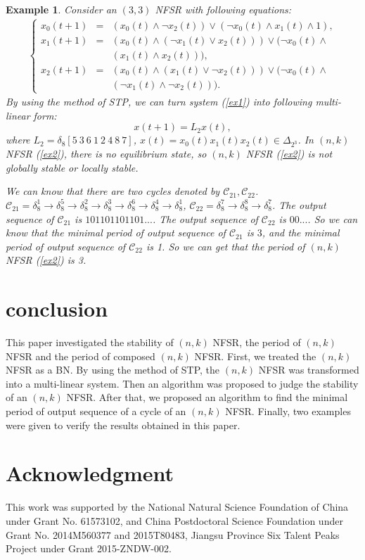 \documentclass[conference]{IEEEtran}
\newtheorem{example}{Example}
\begin{document}
\begin{example}
Consider an $(3,3)$ NFSR with following equations:
\begin{eqnarray}\label{ex2}
 \left\{ \begin{array}{lcl}
x_0(t+1)&=&(x_0(t)\wedge \neg x_2(t))\vee (\neg x_0(t)\wedge x_1(t)\wedge 1),\\
x_1(t+1)&=&(x_0(t)\wedge (\neg x_1(t)\vee x_2(t)))\vee(\neg x_0(t)\wedge \\
&&( x_1(t)\wedge x_2(t))),\\
x_{2}(t+1)&=&(x_0(t)\wedge (x_1(t)\vee \neg x_2(t)))\vee(\neg x_0(t)\wedge\\
&&(\neg x_1(t)\wedge \neg x_2(t))).
\end{array} \right.
\end{eqnarray}
By using the method of STP, we can turn system (\ref{ex1}) into following multi-linear form:
\begin{equation}
x(t+1)=L_2x(t),
\end{equation}
where $L_2=\delta_8[5~3~6~1~2~4~8~7]$, $x(t)=x_0(t)x_1(t)x_2(t)\in \Delta_{2^3}$.
In $(n,k)$ NFSR (\ref{ex2}), there is no equilibrium state, so $(n,k)$ NFSR (\ref{ex2}) is not globally stable or locally stable.

We can know that there are two cycles denoted by $\mathcal{C}_{21}, \mathcal{C}_{22}$. $\mathcal{C}_{21}=\delta^1_8\rightarrow \delta^5_8\rightarrow \delta^2_8\rightarrow \delta^3_8\rightarrow \delta^6_8\rightarrow \delta^4_8\rightarrow \delta^1_8$, $\mathcal{C}_{22}=\delta^7_8\rightarrow \delta^8_8\rightarrow\delta^7_8$. The output sequence of $\mathcal{C}_{21}$ is $101101101101...$. The output sequence of $\mathcal{C}_{22}$ is $00...$. So we can know that the minimal period of output sequence of $\mathcal{C}_{21}$ is $3$, and the minimal period of output sequence of $\mathcal{C}_{22}$ is 1.
So we can get that the period of $(n,k)$ NFSR (\ref{ex2}) is 3.
\end{example}



\section{conclusion}
This paper investigated the stability of $(n,k)$ NFSR, the period of $(n,k)$ NFSR and the period of composed $(n,k)$ NFSR. First, we treated the $(n,k)$ NFSR as a BN. By using the method of STP, the $(n,k)$ NFSR was transformed into a multi-linear system. Then an algorithm was proposed to judge the stability of an $(n,k)$ NFSR. After that, we proposed an algorithm to find the minimal period of output sequence of a cycle of an $(n,k)$ NFSR. Finally, two examples were given to verify the results obtained in this paper.

\section*{Acknowledgment}
This work was supported by the National Natural Science Foundation of China under Grant No. 61573102, and China Postdoctoral Science Foundation under Grant No. 2014M560377 and 2015T80483, Jiangsu Province Six Talent Peaks Project under Grant 2015-ZNDW-002.



\end{document}
